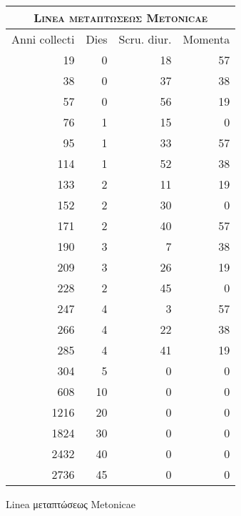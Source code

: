 %
\normalsize
\centering
\begin{tabular}{@{}r r r r@{}}
\toprule
\multicolumn{4}{c}{\Large\textsc{Linea \textgreek{μεταπτώσεως} Metonicae}}\\
\toprule
Anni collecti &
Dies &
Scru. diur. & %
Momenta
\\
\midrule
  19 &  0 & 18 & 57 \\
  38 &  0 & 37 & 38 \\
  57 &  0 & 56 & 19 \\
  76 &  1 & 15 &  0 \\
  95 &  1 & 33 & 57 \\
 114 &  1 & 52 & 38 \\
 133 &  2 & 11 & 19 \\
 152 &  2 & 30 &  0 \\
 171 &  2 & 40 & 57 \\
 190 &  3 &  7 & 38 \\
 209 &  3 & 26 & 19 \\
 228 &  2 & 45 &  0 \\
 247 &  4 &  3 & 57 \\
 266 &  4 & 22 & 38 \\
 285 &  4 & 41 & 19 \\
 304 &  5 &  0 &  0 \\
\midrule
 608 & 10 &  0 &  0 \\
1216 & 20 &  0 &  0 \\
1824 & 30 &  0 &  0 \\
2432 & 40 &  0 &  0 \\
2736 & 45 &  0 &  0 \\
\bottomrule
\end{tabular}
%
\caption{Linea \textgreek{μεταπτώσεως} Metonicae}
\label{tab:p82}
%